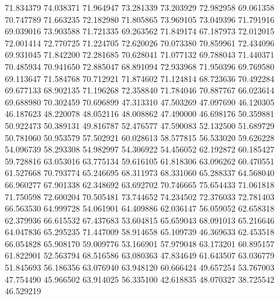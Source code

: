 71.834379
74.038371
71.964947
73.281339
73.203929
72.982958
69.061358
70.747789
71.663235
72.182980
71.805865
73.969105
73.049396
71.791916
69.039016
73.903588
71.721335
69.263562
71.849174
67.187973
72.012015
72.001414
72.770725
71.224705
72.620026
70.073380
70.859961
72.434096
69.931045
71.842200
72.281685
70.628041
71.077132
69.788043
71.440371
70.485934
70.941650
72.885047
68.891094
72.933968
71.950396
69.769580
69.113647
71.584768
70.712921
71.874602
71.124814
68.723636
70.492284
69.677133
68.902135
71.196268
72.358840
71.784046
70.887767
66.023614
69.688980
70.302459
70.696899
47.313310
47.503269
47.097690
46.120305
46.187623
48.220078
48.052116
48.008862
47.490000
46.698176
50.359881
50.922473
50.389131
49.816787
52.476577
47.590083
52.132500
51.689729
50.781060
50.953579
57.502921
60.028613
58.577815
56.533020
59.626228
54.096739
58.293308
54.982997
54.306922
54.456052
62.192872
60.185427
59.728816
63.053016
63.775134
59.616105
61.818306
63.096262
60.470551
61.527668
70.793774
65.246695
68.311973
68.331060
65.288337
64.568040
66.960277
67.901338
62.348692
63.692702
70.746665
75.654433
71.061818
71.750598
72.600204
70.505481
73.744652
74.234502
72.376033
72.781403
66.563530
64.999728
54.061901
64.409886
62.036147
56.059052
62.658318
62.379936
66.615532
67.437683
53.604815
65.659043
68.091013
65.216646
64.047836
65.295235
71.447009
58.914658
65.109739
46.369633
62.453518
66.054828
65.908170
59.009776
53.166901
57.979048
63.173201
60.895157
61.822901
52.563794
68.516586
63.080363
47.834649
61.643507
63.036779
51.845693
56.186356
63.076940
63.948120
60.666424
49.657254
53.767003
47.754490
45.966502
63.914025
56.335100
42.618835
48.070327
38.725542
46.529219
